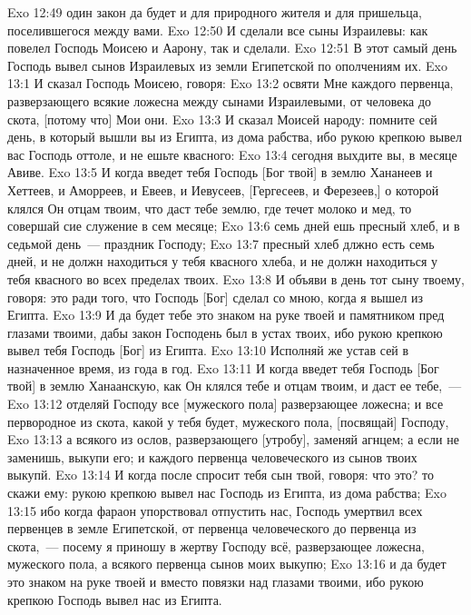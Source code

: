 \vs Exo 12:49 один закон да будет и для природного жителя и для пришельца, поселившегося между вами.
\rsbpar\vs Exo 12:50 И сделали все сыны Израилевы: как повелел Господь Моисею и Аарону, так и сделали.
\vs Exo 12:51 В этот самый день Господь вывел сынов Израилевых из земли Египетской по ополчениям их.
\vs Exo 13:1 И сказал Господь Моисею, говоря:
\vs Exo 13:2 освяти Мне каждого первенца, разверзающего всякие ложесна между сынами Израилевыми, от человека до скота, [потому что] Мои они.
\vs Exo 13:3 И сказал Моисей народу: помните сей день, в который вышли вы из Египта, из дома рабства, ибо рукою крепкою вывел вас Господь оттоле, и не ешьте квасного:
\vs Exo 13:4 сегодня выхдите вы, в месяце Авиве.
\vs Exo 13:5 И когда введет тебя Господь [Бог твой] в землю Хананеев и Хеттеев, и Аморреев, и Евеев, и Иевусеев, [Гергесеев, и Ферезеев,] о которой клялся Он отцам твоим, что даст тебе землю, где течет молоко и мед, то совершай сие служение в сем месяце;
\vs Exo 13:6 семь дней ешь пресный хлеб, и в седьмой день~--- праздник Господу;
\vs Exo 13:7 пресный хлеб длжно есть семь дней, и не должн находиться у тебя квасного хлеба, и не должн находиться у тебя квасного во всех пределах твоих.
\vs Exo 13:8 И объяви в день тот сыну твоему, говоря: это ради того, что Господь [Бог] сделал со мною, когда я вышел из Египта.
\vs Exo 13:9 И да будет тебе это знаком на руке твоей и памятником пред глазами твоими, дабы закон Господень был в устах твоих, ибо рукою крепкою вывел тебя Господь [Бог] из Египта.
\vs Exo 13:10 Исполняй же устав сей в назначенное время, из года в год.
\vs Exo 13:11 И когда введет тебя Господь [Бог твой] в землю Ханаанскую, как Он клялся тебе и отцам твоим, и даст ее тебе,~---
\vs Exo 13:12 отделяй Господу все [мужеского пола] разверзающее ложесна; и все первородное из скота, какой у тебя будет, мужеского пола, [посвящай] Господу,
\vs Exo 13:13 а всякого из ослов, разверзающего [утробу], заменяй агнцем; а если не заменишь, выкупи его; и каждого первенца человеческого из сынов твоих выкупй.
\vs Exo 13:14 И когда после спросит тебя сын твой, говоря: что это? то скажи ему: рукою крепкою вывел нас Господь из Египта, из дома рабства;
\vs Exo 13:15 ибо когда фараон упорствовал отпустить нас, Господь умертвил всех первенцев в земле Египетской, от первенца человеческого до первенца из скота,~--- посему я приношу в жертву Господу всё, разверзающее ложесна, мужеского пола, а всякого первенца  сынов моих выкупю;
\vs Exo 13:16 и да будет это знаком на руке твоей и вместо повязки над глазами твоими, ибо рукою крепкою Господь вывел нас из Египта.
